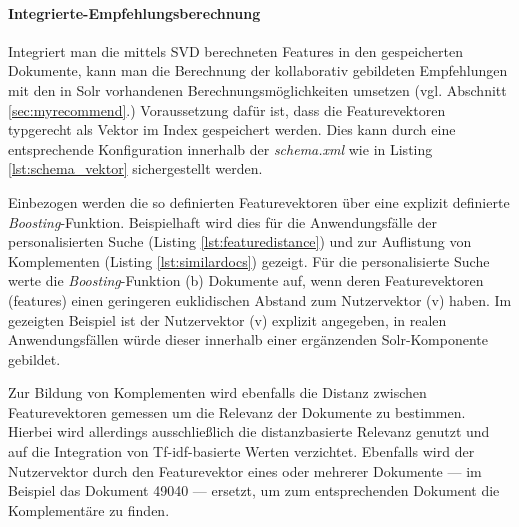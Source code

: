 

\paragraph{Integrierte-Empfehlungsberechnung} Integriert man die mittels SVD berechneten Features in den gespeicherten Dokumente, kann man die Berechnung der kollaborativ gebildeten Empfehlungen mit den in Solr vorhandenen Berechnungsmöglichkeiten umsetzen (vgl.  Abschnitt \ref{sec:myrecommend}.) Voraussetzung dafür ist, dass die Featurevektoren typgerecht als Vektor im Index gespeichert werden. Dies kann durch eine entsprechende Konfiguration innerhalb der \textit{schema.xml} wie in Listing \ref{lst:schema_vektor} sichergestellt werden.



Einbezogen werden die so definierten Featurevektoren über eine explizit definierte \textit{Boosting}-Funktion. Beispielhaft wird dies für die Anwendungsfälle der personalisierten Suche (Listing \ref{lst:featuredistance}) und zur Auflistung von Komplementen (Listing \ref{lst:similardocs}) gezeigt. Für die personalisierte Suche werte die \textit{Boosting}-Funktion (b) Dokumente auf, wenn deren Featurevektoren (features) einen geringeren euklidischen Abstand zum Nutzervektor (v) haben. Im gezeigten Beispiel ist der Nutzervektor (v) explizit angegeben, in realen Anwendungsfällen würde dieser innerhalb einer  ergänzenden Solr-Komponente gebildet.



Zur Bildung von Komplementen wird ebenfalls die Distanz zwischen Featurevektoren gemessen um die Relevanz der Dokumente zu bestimmen. Hierbei wird allerdings ausschließlich die distanzbasierte Relevanz genutzt und auf die Integration von Tf-idf-basierte Werten verzichtet. Ebenfalls wird der Nutzervektor durch den Featurevektor eines oder mehrerer Dokumente --- im Beispiel das Dokument 49040 --- ersetzt, um zum entsprechenden Dokument die Komplementäre zu finden.



